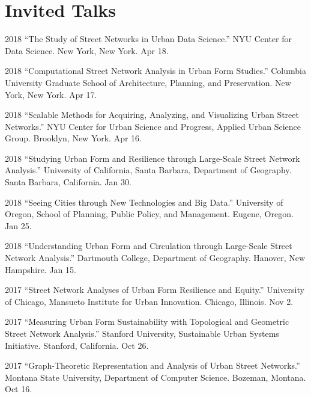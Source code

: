 \documentclass{academiccv}
\begin{document}
\section*{Invited Talks}

\begin{tablist}

\item[2018] \tab \enquote{The Study of Street Networks in Urban Data Science.} NYU Center for Data Science. New York, New York. Apr 18.

\item[2018] \tab \enquote{Computational Street Network Analysis in Urban Form Studies.} Columbia University Graduate School of Architecture, Planning, and Preservation. New York, New York. Apr 17.

\item[2018] \tab \enquote{Scalable Methods for Acquiring, Analyzing, and Visualizing Urban Street Networks.} NYU Center for Urban Science and Progress, Applied Urban Science Group. Brooklyn, New York. Apr 16.

\item[2018] \tab \enquote{Studying Urban Form and Resilience through Large-Scale Street Network Analysis.} University of California, Santa Barbara, Department of Geography. Santa Barbara, California. Jan 30.

\item[2018] \tab \enquote{Seeing Cities through New Technologies and Big Data.} University of Oregon, School of Planning, Public Policy, and Management. Eugene, Oregon. Jan 25.

\item[2018] \tab \enquote{Understanding Urban Form and Circulation through Large-Scale Street Network Analysis.} Dartmouth College, Department of Geography. Hanover, New Hampshire. Jan 15.

\item[2017] \tab \enquote{Street Network Analyses of Urban Form Resilience and Equity.} University of Chicago, Mansueto Institute for Urban Innovation. Chicago, Illinois. Nov 2.

\item[2017] \tab \enquote{Measuring Urban Form Sustainability with Topological and Geometric Street Network Analysis.} Stanford University, Sustainable Urban Systems Initiative. Stanford, California. Oct 26.

\item[2017] \tab \enquote{Graph-Theoretic Representation and Analysis of Urban Street Networks.} Montana State University, Department of Computer Science. Bozeman, Montana. Oct 16.


\end{tablist}
\end{document}
